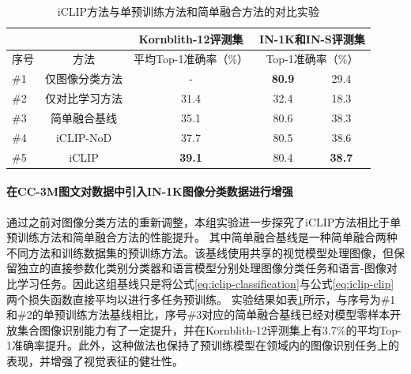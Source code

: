\begin{table}
  \centering
\caption{iCLIP方法与单预训练方法和简单融合方法的对比实验}
  \begin{tabular}{lcccc}
    \toprule
    \multicolumn{1}{c}{} &
    \multicolumn{1}{c}{} & 
    \multicolumn{1}{c}{Kornblith-12评测集}
    & \multicolumn{2}{c}{IN-1K和IN-S评测集} \\
    \midrule
    序号 & 方法 & 平均Top-1准确率（\%） & \multicolumn{2}{c}{Top-1准确率（\%）} \\
    \midrule
    \#1 & 仅图像分类方法 & - & \textbf{80.9} & 29.4 \\
    \#2 & 仅对比学习方法 & 31.4 & 32.4 & 18.3  \\
    \#3 & 简单融合基线 & 35.1 & 80.6 & 38.3 \\
    \#4 & iCLIP-NoD & 37.7 & 80.5 & 38.6 \\
    \#5 & iCLIP & \textbf{39.1} & 80.4 & \textbf{38.7} \\
    \bottomrule
  \end{tabular}
  \label{tab:iclip-ablate_cc}
\end{table}

\paragraph{在CC-3M图文对数据中引入IN-1K图像分类数据进行增强}
通过之前对图像分类方法的重新调整，本组实验进一步探究了iCLIP方法相比于单预训练方法和简单融合方法的性能提升。
其中简单融合基线是一种简单融合两种不同方法和训练数据集的预训练方法。该基线使用共享的视觉模型处理图像，但保留独立的直接参数化类别分类器和语言模型分别处理图像分类任务和语言-图像对比学习任务。因此这组基线只是将公式\eqref{eq:iclip-classification}与公式\eqref{eq:iclip-clip}两个损失函数直接平均以进行多任务预训练。
实验结果如表\ref{tab:iclip-ablate_cc}所示，与序号为\#1和\#2的单预训练方法基线相比，序号\#3对应的简单融合基线已经对模型零样本开放集合图像识别能力有了一定提升，并在Kornblith-12评测集上有3.7\%的平均Top-1准确率提升。此外，这种做法也保持了预训练模型在领域内的图像识别任务上的表现，并增强了视觉表征的健壮性。

